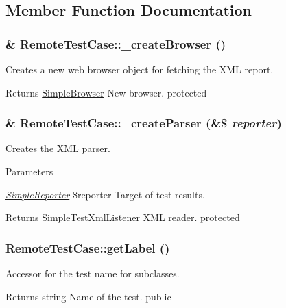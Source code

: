 \subsection{Member Function Documentation}
\hypertarget{class_remote_test_case_a29a8f3f05c7546983e7b328b39b3eeb2}{
\subsubsection[{\_\-createBrowser}]{\setlength{\rightskip}{0pt plus 5cm}\& RemoteTestCase::\_\-createBrowser ()}}
\label{class_remote_test_case_a29a8f3f05c7546983e7b328b39b3eeb2}
Creates a new web browser object for fetching the XML report. \begin{DoxyReturn}{Returns}
\hyperlink{class_simple_browser}{SimpleBrowser} New browser.  protected 
\end{DoxyReturn}
\hypertarget{class_remote_test_case_ad85338bf69bf50ccaa23b127f44c6cfb}{
\subsubsection[{\_\-createParser}]{\setlength{\rightskip}{0pt plus 5cm}\& RemoteTestCase::\_\-createParser (\&\$ {\em reporter})}}
\label{class_remote_test_case_ad85338bf69bf50ccaa23b127f44c6cfb}
Creates the XML parser. 
\begin{DoxyParams}{Parameters}
\item[{\em \hyperlink{class_simple_reporter}{SimpleReporter}}]\$reporter Target of test results. \end{DoxyParams}
\begin{DoxyReturn}{Returns}
SimpleTestXmlListener XML reader.  protected 
\end{DoxyReturn}
\hypertarget{class_remote_test_case_a0003c0c46b06c2ff40f51c327db5d55b}{
\subsubsection[{getLabel}]{\setlength{\rightskip}{0pt plus 5cm}RemoteTestCase::getLabel ()}}
\label{class_remote_test_case_a0003c0c46b06c2ff40f51c327db5d55b}
Accessor for the test name for subclasses. \begin{DoxyReturn}{Returns}
string Name of the test.  public 
\end{DoxyReturn}

